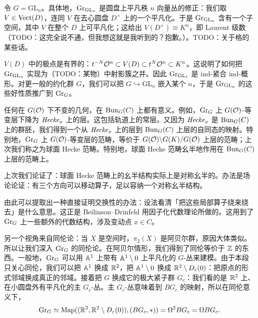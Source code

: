 \begin{example}
令 $G=\mathrm{GL}_n$。具体地，$\mathrm{Gr}_{\mathrm{GL}_n}$ 是圆盘上平凡秩 $n$ 向量丛的修正：我们取 $V\in\mathrm{Vect}(D)$，连同 $V$ 在去心圆盘 $D^\times$ 上的一个平凡化。于是 $\mathrm{Gr}_{\mathrm{GL}_n}$ 含有一个子空间，其中 $V$ 在整个 $D$ 上可平凡化；这给出 $V(D^\times)\cong K^n$，即 Laurent 级数（TODO：这完全说不通，但我想这就是我听到的？抱歉。）。TODO：关于格的某些话。

$V(D)$ 中的极点是有界的：$t^{-N}\mathcal{O}^n\subset V(D)\subset t^N\mathcal{O}^n\subset K^n$。这说明了如何把 $\mathrm{Gr}_{\mathrm{GL}_n}$ 实现为（TODO：某物）中射影簇之并。因此 $\mathrm{Gr}_{\mathrm{GL}_1}$ 是 ind-紧合 ind-概形。对更一般的约化群 $G$，我们可以把 $G\hookrightarrow\mathrm{GL}_n$ 嵌入某个 $n$，于是 $\mathrm{Gr}_{\mathrm{GL}_n}$ 的这些好性质推广到 $\mathrm{Gr}_G$。
\end{example}

任何在 $G(\mathcal{O})$ 下不变的几何，在 $\mathrm{Bun}_G(C)$ 上都有意义。例如，$\mathrm{Gr}_G$ 上 $G(\mathcal{O})$-等变层下降为 $\mathit{Hecke}_x$ 上的层。这包括轨道上的常层。又因为 $\mathit{Hecke}_x$ 是 $\mathrm{Bun}_G(C)$ 上的群胚，我们得到一个从 $\mathit{Hecke}_x$ 上的层到 $\mathrm{Bun}_G(C)$ 上层的自同态的映射。特别地，$\mathrm{Gr}_G$ 上 $G(\mathcal{O})$-等变层的范畴，等价于 $G(\mathcal{O})\backslash G(K)/G(\mathcal{O})$ 上层的范畴；上次我们称之为球面 Hecke 范畴。特别地，球面 Hecke 范畴幺半地作用在 $\mathrm{Bun}_G(C)$ 上层的范畴上。

上次我们论证了：球面 Hecke 范畴上的幺半结构实际上是对称幺半的。办法是场论论证：有三个方向可以移动算子，足以容纳一个对称幺半结构。

由此可以提取出一种直接证明交换性的办法：设法看清「把这些局部算子绕来绕去」是什么意思。这正是 Beilinson–Drinfeld 用因子化代数理论所做的。这用到了 $\mathrm{Gr}_G$ 上一些额外的代数结构，涉及变动点 $x\in C$。

另一个视角来自同伦论：当 $X$ 是空间时，$\pi_2(X)$ 是阿贝尔群，原因大体类似。所以让我们深入 $\mathrm{Gr}_G$ 的同伦论。在阿贝尔情形，我们得到了同伦等价于 $\mathbb{Z}$ 的东西。一般地，$\mathrm{Gr}_G$ 可以用 $\mathbb{A}^1$ 上带有 $\mathbb{A}^1\setminus 0$ 上平凡化的 $G$-丛来建模。由于本段只关心同伦，我们可以把 $\mathbb{A}^1$ 换成 $\mathbb{R}^2$，把 $\mathbb{A}^1\setminus 0$ 换成 $\mathbb{R}^2\setminus D_\varepsilon(0)$：把原点的形式邻域换成真正的邻域。接着把 $G$ 换成它的极大紧子群 $G_c$：我们看的是 $\mathbb{R}^2$ 上、在小圆盘外有平凡化的主 $G_c$-丛。主 $G_c$-丛意味着到 $BG_c$ 的映射，所以在同伦意义下，
\[
  \mathrm{Gr}_G \simeq \mathrm{Map}((\mathbb{R}^2,\mathbb{R}^2\setminus D_\varepsilon(0)),(BG_c,*))
  = \Omega^2 BG_c = \Omega BG_c.
\]


